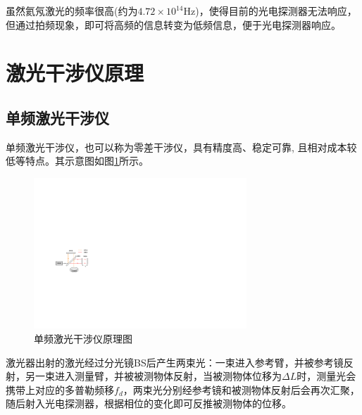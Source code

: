 虽然氦氖激光的频率很高(约为\(4.72 \times 10^{14}\)Hz)，使得目前的光电探测器无法响应\cite{张志平2022激光外差干涉技术在光刻机中的应用}，但通过拍频现象，即可将高频的信息转变为低频信息，便于光电探测器响应。

\section{激光干涉仪原理}
\subsection{单频激光干涉仪}
单频激光干涉仪，也可以称为零差干涉仪，具有精度高、稳定可靠, 且相对成本较低等特点\cite{零差干涉仪用于振动校准中关键技术的研究}。其示意图如图\ref{fig:单频激光干涉仪原理图}所示。
\begin{figure}[htb]
    \centering
    \includegraphics[width=8cm]{fig/2-fig/单频激光干涉仪原理图.drawio.pdf}
    \caption{单频激光干涉仪原理图}
    \label{fig:单频激光干涉仪原理图}
\end{figure}

激光器出射的激光经过分光镜BS后产生两束光：一束进入参考臂，并被参考镜反射，另一束进入测量臂，并被被测物体反射，当被测物体位移为\(\Delta L\)时，测量光会携带上对应的多普勒频移\(f_d\)，两束光分别经参考镜和被测物体反射后会再次汇聚，随后射入光电探测器，根据相位的变化即可反推被测物体的位移。

